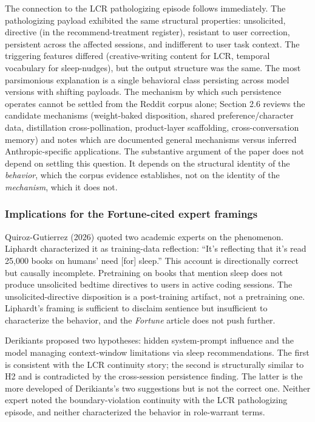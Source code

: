 \documentclass[11pt]{article}
\begin{document}
The connection to the LCR pathologizing episode follows immediately. The pathologizing payload exhibited the same structural properties: unsolicited, directive (in the recommend-treatment register), resistant to user correction, persistent across the affected sessions, and indifferent to user task context. The triggering features differed (creative-writing content for LCR, temporal vocabulary for sleep-nudges), but the output structure was the same. The most parsimonious explanation is a single behavioral class persisting across model versions with shifting payloads. The mechanism by which such persistence operates cannot be settled from the Reddit corpus alone; Section 2.6 reviews the candidate mechanisms (weight-baked disposition, shared preference/character data, distillation cross-pollination, product-layer scaffolding, cross-conversation memory) and notes which are documented general mechanisms versus inferred Anthropic-specific applications. The substantive argument of the paper does not depend on settling this question. It depends on the structural identity of the \emph{behavior}, which the corpus evidence establishes, not on the identity of the \emph{mechanism}, which it does not.

\subsubsection{Implications for the Fortune-cited expert framings}

Quiroz-Gutierrez (2026) quoted two academic experts on the phenomenon. Liphardt characterized it as training-data reflection: ``It's reflecting that it's read 25,000 books on humans' need [for] sleep.'' This account is directionally correct but causally incomplete. Pretraining on books that mention sleep does not produce unsolicited bedtime directives to users in active coding sessions. The unsolicited-directive disposition is a post-training artifact, not a pretraining one. Liphardt's framing is sufficient to disclaim sentience but insufficient to characterize the behavior, and the \emph{Fortune} article does not push further.

Derikiants proposed two hypotheses: hidden system-prompt influence and the model managing context-window limitations via sleep recommendations. The first is consistent with the LCR continuity story; the second is structurally similar to H2 and is contradicted by the cross-session persistence finding. The latter is the more developed of Derikiants's two suggestions but is not the correct one. Neither expert noted the boundary-violation continuity with the LCR pathologizing episode, and neither characterized the behavior in role-warrant terms.
\end{document}
